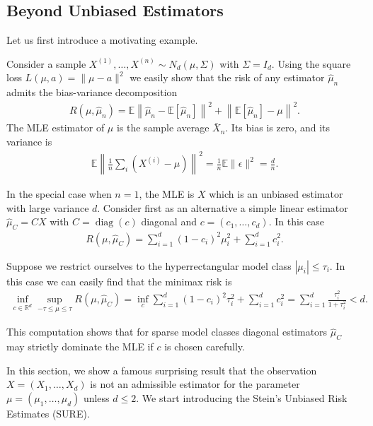 \subsection{Beyond Unbiased Estimators}
Let us first introduce a motivating example.

Consider a sample $X^{(1)}, \ldots, X^{(n)} \sim N_d(\mu, \Sigma)$ with $\Sigma=I_d$. Using the square loss $L(\mu, a)=\|\mu-a\|^2$ we easily show that the risk of any estimator $\widehat{\mu}_n$ admits the bias-variance decomposition
\begin{align*}
R\left(\mu, \widehat{\mu}_n\right)=\mathbb{E}\left\|\widehat{\mu}_n-\mathbb{E}\left[\widehat{\mu}_n\right]\right\|^2+\left\|\mathbb{E}\left[\widehat{\mu}_n\right]-\mu\right\|^2 .
\end{align*}
The MLE estimator of $\mu$ is the sample average $\bar{X}_n$. Its bias is zero, and its variance is
\begin{align*}
\mathbb{E}\left\|\frac{1}{n} \sum_i\left(X^{(i)}-\mu\right)\right\|^2=\frac{1}{n} \mathbb{E}\|\epsilon\|^2=\frac{d}{n} .
\end{align*}

In the special case when $n=1$, the MLE is $X$ which is an unbiased estimator with large variance $d$. Consider first as an alternative a simple linear estimator $\widehat{\mu}_C=C X$ with $C=\operatorname{diag}(c)$ diagonal and $c=\left(c_1, \ldots, c_d\right)$. In this case
\begin{align*}
R\left(\mu, \widehat{\mu}_C\right)=\sum_{i=1}^d\left(1-c_i\right)^2 \mu_i^2+\sum_{i=1}^d c_i^2 .
\end{align*}


Suppose we restrict ourselves to the hyperrectangular model class $\left|\mu_i\right| \leq \tau_i$. In this case we can easily find that the minimax risk is
\begin{align*}
\inf _{c \in \mathbb{R}^d} \sup _{-\tau \leq \mu \leq \tau} R\left(\mu, \widehat{\mu}_C\right)=\inf _c \sum_{i=1}^d\left(1-c_i\right)^2 \tau_i^2+\sum_{i=1}^d c_i^2=\sum_{i=1}^d \frac{\tau_i^2}{1+\tau_i^2}<d .
\end{align*}


This computation shows that for sparse model classes diagonal estimators $\widehat{\mu}_C$ may strictly dominate the MLE if $c$ is chosen carefully.

In this section, we show a famous surprising result that the observation $X=\left(X_1, \ldots, X_d\right)$ is not an admissible estimator for the parameter $\mu=\left(\mu_1, \ldots, \mu_d\right)$ unless $d \leq 2$. We start introducing the Stein's Unbiased Risk Estimates (SURE).


